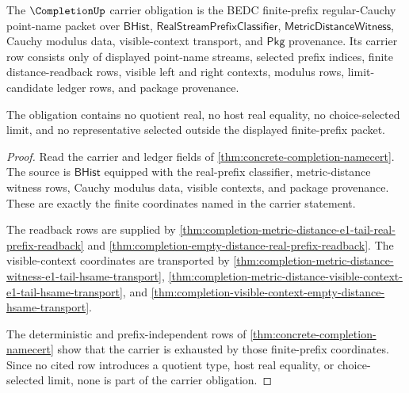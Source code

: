 \begin{theorem}\label{thm:completion-carrier-obligation}
The $\CompletionUp$ carrier obligation is the BEDC finite-prefix regular-Cauchy point-name packet over $\mathsf{BHist}$, $\mathsf{RealStreamPrefixClassifier}$, $\mathsf{MetricDistanceWitness}$, Cauchy modulus data, visible-context transport, and $\mathsf{Pkg}$ provenance. Its carrier row consists only of displayed point-name streams, selected prefix indices, finite distance-readback rows, visible left and right contexts, modulus rows, limit-candidate ledger rows, and package provenance.

The obligation contains no quotient real, no host real equality, no choice-selected limit, and no representative selected outside the displayed finite-prefix packet.
\end{theorem}
\begin{proof}
Read the carrier and ledger fields of \autoref{thm:concrete-completion-namecert}. The source is $\mathsf{BHist}$ equipped with the real-prefix classifier, metric-distance witness rows, Cauchy modulus data, visible contexts, and package provenance. These are exactly the finite coordinates named in the carrier statement.

The readback rows are supplied by \autoref{thm:completion-metric-distance-e1-tail-real-prefix-readback} and \autoref{thm:completion-empty-distance-real-prefix-readback}. The visible-context coordinates are transported by \autoref{thm:completion-metric-distance-witness-e1-tail-hsame-transport}, \autoref{thm:completion-metric-distance-visible-context-e1-tail-hsame-transport}, and \autoref{thm:completion-visible-context-empty-distance-hsame-transport}.

The deterministic and prefix-independent rows of \autoref{thm:concrete-completion-namecert} show that the carrier is exhausted by those finite-prefix coordinates. Since no cited row introduces a quotient type, host real equality, or choice-selected limit, none is part of the carrier obligation.
\end{proof}

